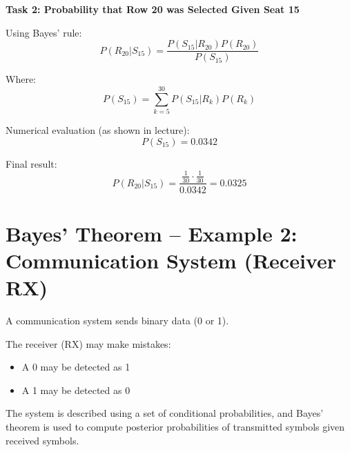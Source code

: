 \documentclass[12pt]{article}
\begin{document}
\textbf{Task 2: Probability that Row 20 was Selected Given Seat 15}

Using Bayes’ rule:
\[
P(R_{20} | S_{15}) =
\frac{P(S_{15} | R_{20})P(R_{20})}{P(S_{15})}
\]

Where:
\[
P(S_{15}) = \sum_{k=5}^{30} P(S_{15} | R_k) P(R_k)
\]

Numerical evaluation (as shown in lecture):
\[
P(S_{15}) = 0.0342
\]

Final result:
\[
P(R_{20} | S_{15}) =
\frac{\frac{1}{30} \cdot \frac{1}{30}}{0.0342}
= 0.0325
\]

\section{Bayes’ Theorem – Example 2: Communication System (Receiver RX)}

A communication system sends binary data (0 or 1).

The receiver (RX) may make mistakes:
\begin{itemize}
    \item A 0 may be detected as 1
    \item A 1 may be detected as 0
\end{itemize}

The system is described using a set of conditional probabilities, and Bayes’ theorem is used to compute posterior probabilities of transmitted symbols given received symbols.
\end{document}
